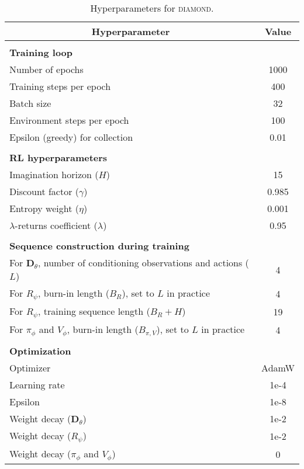 \begin{table}[h!]
\caption{Hyperparameters for \textsc{diamond}.}
\label{tbl_atari_hypers}
\begin{center}
\begin{tabular}{ l c }
\multicolumn{1}{c}{\textbf{Hyperparameter}}  & \multicolumn{1}{c}{\textbf{Value}} \\ 

\hline \\

\multicolumn{2}{l}{\textbf{Training loop}} \\
Number of epochs & 1000 \\
Training steps per epoch & 400 \\
Batch size & 32 \\
Environment steps per epoch & 100 \\
Epsilon (greedy) for collection & 0.01 \\

\\

\multicolumn{2}{l}{\textbf{RL hyperparameters}} \\
Imagination horizon ($H$) & 15 \\
Discount factor ($\gamma$) &  0.985 \\ 
Entropy weight ($\eta$) & 0.001 \\ 
$\lambda$-returns coefficient ($\lambda$) & 0.95 \\

\\

\multicolumn{2}{l}{\textbf{Sequence construction during training}} \\
For $\mathbf{D}_\theta$, number of conditioning observations and actions ($L$) & 4 \\
For $R_\psi$, burn-in length ($B_{R}$), set to $L$ in practice & 4 \\ 
For $R_\psi$, training sequence length ($B_{R} + H$) & 19 \\
For $\pi_\phi$ and $V_\phi$, burn-in length ($B_{\pi,V}$), set to $L$ in practice & 4 \\

\\
\multicolumn{2}{l}{\textbf{Optimization}} \\
Optimizer & AdamW \\
Learning rate & 1e-4 \\
Epsilon & 1e-8 \\
Weight decay ($\mathbf{D}_\theta$) & 1e-2 \\
Weight decay ($R_\psi$) & 1e-2 \\
Weight decay ($\pi_\phi$ and $V_\phi$)  & 0 \\


\end{tabular}
\end{center}
\end{table}
